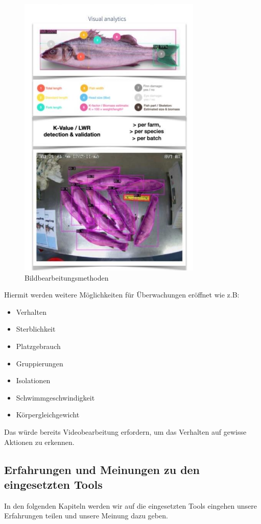 \documentclass[../main.tex]{subfiles}
\begin{document}
	\begin{figure}[H]
		\centering
		\includegraphics{../images/Imageprocessing} 
		\caption{Bildbearbeitungsmethoden}
		\label{fig:Imageprocessing}
	\end{figure}
	
	\par \noindent
	Hiermit werden weitere Möglichkeiten für Überwachungen eröffnet wie z.B:
	
	\begin{itemize}
	 	\item Verhalten 
	 	\item Sterblichkeit
	 	\item Platzgebrauch
	 	\item Gruppierungen
	 	\item Isolationen
	 	\item Schwimmgeschwindigkeit
	 	\item Körpergleichgewicht
	\end{itemize}
\noindent
	Das würde bereits Videobearbeitung erfordern, um das Verhalten auf gewisse Aktionen zu erkennen. 
	
	\subsection{Erfahrungen und Meinungen zu den eingesetzten Tools}
	In den folgenden Kapiteln werden wir auf die eingesetzten Tools eingehen unsere Erfahrungen teilen und unsere Meinung dazu geben.
	
\end{document}

